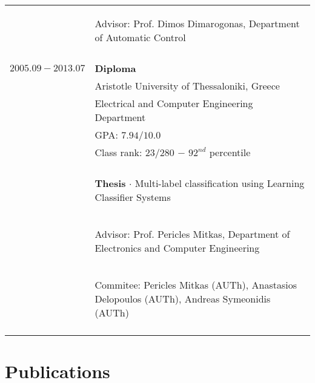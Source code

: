 \documentclass[a4paper,10pt,twoside]{article}
\begin{document}
\begin{tabular}{rp{11cm}}
                     & \begin{small}Advisor: Prof. Dimos Dimarogonas, Department of Automatic Control\end{small} \\
&\\
$2005.09 - 2013.07$  & \textbf{Diploma} \\
                     & Aristotle University of Thessaloniki, Greece \\
                     & Electrical and Computer Engineering Department \\
                     & GPA: $7.94 / 10.0$ \\
                     & Class rank: $23 / 280$ $-$ $92^{nd}$ percentile \\
                     &\\
                     & \begin{small}\textbf{Thesis} $\cdot$ Multi-label classification using Learning Classifier Systems \end{small}\\
                     & \begin{small}Advisor: Prof. Pericles Mitkas, Department of Electronics and Computer Engineering\end{small}\\
                     & \begin{small}Commitee: Pericles Mitkas (AUTh), Anastasios Delopoulos (AUTh), Andreas Symeonidis (AUTh) \end{small}\\
&\\


\end{tabular}

\vspace*{\fill}
\newpage


\section{Publications}
\end{document}
